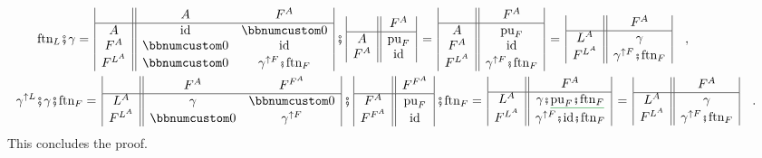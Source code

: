 \begin{align*}
 & \text{ftn}_{L}\bef\gamma=\,\begin{array}{|c||cc|}
 & A & F^{A}\\
\hline A & \text{id} & \bbnum 0\\
F^{A} & \bbnum 0 & \text{id}\\
F^{L^{A}} & \bbnum 0 & \gamma^{\uparrow F}\bef\text{ftn}_{F}
\end{array}\,\bef\,\begin{array}{|c||c|}
 & F^{A}\\
\hline A & \text{pu}_{F}\\
F^{A} & \text{id}
\end{array}\,=\,\begin{array}{|c||c|}
 & F^{A}\\
\hline A & \text{pu}_{F}\\
F^{A} & \text{id}\\
F^{L^{A}} & \gamma^{\uparrow F}\bef\text{ftn}_{F}
\end{array}\,=\,\begin{array}{|c||c|}
 & F^{A}\\
\hline L^{A} & \gamma\\
F^{L^{A}} & \gamma^{\uparrow F}\bef\text{ftn}_{F}
\end{array}\quad,\\
 & \negthickspace\negthickspace\negthickspace\negthickspace\negthickspace\negthickspace\gamma^{\uparrow L}\bef\gamma\bef\text{ftn}_{F}=\,\begin{array}{|c||cc|}
 & F^{A} & F^{F^{A}}\\
\hline L^{A} & \gamma & \bbnum 0\\
F^{L^{A}} & \bbnum 0 & \gamma^{\uparrow F}
\end{array}\,\bef\,\begin{array}{|c||c|}
 & F^{F^{A}}\\
\hline F^{A} & \text{pu}_{F}\\
F^{F^{A}} & \text{id}
\end{array}\,\bef\text{ftn}_{F}=\,\begin{array}{|c||c|}
 & F^{A}\\
\hline L^{A} & \gamma\bef\gunderline{\text{pu}_{F}\bef\text{ftn}_{F}}\\
F^{L^{A}} & \gamma^{\uparrow F}\bef\text{id}\bef\text{ftn}_{F}
\end{array}\,=\,\begin{array}{|c||c|}
 & F^{A}\\
\hline L^{A} & \gamma\\
F^{L^{A}} & \gamma^{\uparrow F}\bef\text{ftn}_{F}
\end{array}\quad.
\end{align*}
This concludes the proof.

